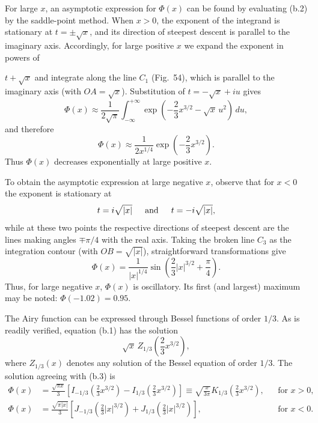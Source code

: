 For large $x$, an asymptotic expression for $\Phi(x)$ can be found by
evaluating (b.2) by the saddle-point method. When $x>0$, the exponent of the
integrand is stationary at $t=\pm\sqrt{x}$, and its direction of steepest
descent is parallel to the imaginary axis. Accordingly, for large positive
$x$ we expand the exponent in powers of

$t+\sqrt{x}$ and integrate along the line $C_1$ (Fig.~54), which is parallel
to the imaginary axis (with $OA=\sqrt{x}$). Substitution of
$t=-\sqrt{x}+iu$ gives
\[
 \Phi(x)\approx\frac1{2\sqrt\pi}\int_{-\infty}^{+\infty}
 \exp\left(-\frac23x^{3/2}-\sqrt{x}\,u^2\right)\,du,
\]
and therefore
\begin{equation}
 \Phi(x)\approx\frac1{2x^{1/4}}\exp\left(-\frac23x^{3/2}\right).
 \tag{b.4}
\end{equation}
Thus $\Phi(x)$ decreases exponentially at large positive $x$.

To obtain the asymptotic expression at large negative $x$, observe that for
$x<0$ the exponent is stationary at
\[
 t=i\sqrt{|x|}\hspace{1.5em}\text{and}\hspace{1.5em}t=-i\sqrt{|x|},
\]
while at these two points the respective directions of steepest descent are
the lines making angles $\mp\pi/4$ with the real axis. Taking the broken line
$C_3$ as the integration contour (with $OB=\sqrt{|x|}$), straightforward
transformations give
\begin{equation}
 \Phi(x)=\frac1{|x|^{1/4}}
 \sin\left(\frac23|x|^{3/2}+\frac\pi4\right).
 \tag{b.5}
\end{equation}
Thus, for large negative $x$, $\Phi(x)$ is oscillatory. Its first (and
largest) maximum may be noted: $\Phi(-1.02)=0.95$.

The Airy function can be expressed through Bessel functions of order $1/3$.
As is readily verified, equation (b.1) has the solution
\[
 \sqrt{x}\,Z_{1/3}\left(\frac23x^{3/2}\right),
\]
where $Z_{1/3}(x)$ denotes any solution of the Bessel equation of order
$1/3$. The solution agreeing with (b.3) is
\begin{align}
 \Phi(x)&=\frac{\sqrt{\pi x}}3
 \left[I_{-1/3}\left(\frac23x^{3/2}\right)
 -I_{1/3}\left(\frac23x^{3/2}\right)\right]
 \equiv\sqrt{\frac{x}{3\pi}}K_{1/3}\left(\frac23x^{3/2}\right),
 &&\text{for }x>0,\nonumber\\
 \Phi(x)&=\frac{\sqrt{\pi|x|}}3
 \left[J_{-1/3}\left(\frac23|x|^{3/2}\right)
 +J_{1/3}\left(\frac23|x|^{3/2}\right)\right],
 &&\text{for }x<0.
 \tag{b.6}
\end{align}

